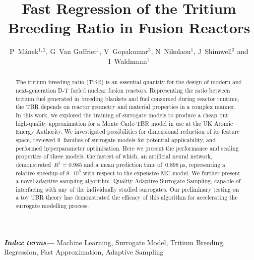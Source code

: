 \documentclass[12pt]{iopart}
\providecommand{\keywords}[1]{\textbf{\textit{Index terms---}} #1}
\begin{document}

\title[Fast Regression of the Tritium Breeding Ratio in Fusion Reactors]{Fast Regression of the
Tritium Breeding Ratio in Fusion Reactors}

\author{P~Mánek$^{1,2}$, G~Van Goffrier$^1$, V~Gopakumar$^3$, N~Nikolaou$^1$, J~Shimwell$^3$ and I~Waldmann$^1$}

\address{$^1$ Department of Physics and Astronomy, University College London, Gower Street, London WC1E~6BT, UK}
\address{$^2$ Institute of Experimental and Applied Physics, Czech Technical University, Husova 240/5, Prague 110~00, Czech Republic}
\address{$^3$ UK Atomic Energy Authority, Culham Science Centre, OX14~3DB Abingdon, UK}


\begin{abstract}
	The tritium breeding ratio (TBR) is an essential quantity for the design of
	modern and next-generation D-T fueled nuclear fusion reactors. Representing the
	ratio between tritium fuel generated in breeding blankets and fuel consumed
	during reactor runtime, the TBR depends on reactor geometry and material
	properties in a complex manner. In this work, we explored the
	training of surrogate models to produce a cheap but high-quality approximation
	for a Monte Carlo TBR model in use at the UK Atomic Energy Authority. We
	investigated possibilities for dimensional reduction of its feature space, reviewed
	9~families of surrogate models for potential
	applicability, and performed hyperparameter optimisation. Here we present the
	performance and scaling properties of these
	models, the fastest of which, an artificial neural network,
	demonstrated~$R^2=\num{0.985}$ and a mean
	prediction time of~$\SI{0.898}{\micro\second}$, representing a relative speedup of $8\cdot 10^6$
	with respect to the expensive MC model. We further present a novel adaptive
	sampling algorithm, Quality-Adaptive Surrogate Sampling, capable
	of interfacing with any of the individually studied surrogates. Our preliminary
	testing on a toy TBR theory has demonstrated the efficacy of this algorithm for
	accelerating the surrogate modelling process.
\end{abstract}

\keywords{Machine Learning, Surrogate Model, Tritium Breeding, Regression, Fast Approximation, Adaptive Sampling}
\submitto{\NF}
\maketitle
\ioptwocol
\end{document}
